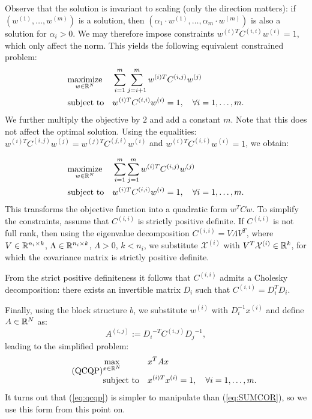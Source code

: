 Observe that the solution is invariant to scaling (only the direction matters): 
if $\left(w^{(1)}, \ldots, w^{(m)}\right)$ is a solution, then 
$\left(\alpha_1 \cdot w^{(1)}, \ldots, \alpha_m \cdot w^{(m)}\right)$ is also a 
solution for $\alpha_i > 0$. We may therefore impose constraints $w^{(i)T}C^{(i,i)}w^{(i)} = 1$, 
which only affect the norm. This yields the following  equivalent constrained problem:
\begin{equation}\label{eq:qcqp0}
\begin{aligned}
& \underset{w \in \mathbb{R}^N}{\text{maximize}}
& & \sum_{i = 1}^m \sum_{j = i+1}^m w^{(i)T} C^{(i,j)} w^{(j)}\\
& \text{subject to}
& &w^{(i)T} C^{(i,i)} w^{(i)} = 1, \quad\forall i = 1,\ldots, m.
\end{aligned}
\end{equation}
We further multiply the objective by $2$ and add a constant $m$. Note that this does not
affect the optimal solution. Using the equalities: $w^{(i)T} C^{(i,j)} w^{(j)} = w^{(j)T} C^{(j,i)} w^{(i)}$ 
and $w^{(i)T} C^{(i,i)} w^{(i)} = 1$, we obtain:

\begin{equation}\label{eq:qcqp05}
\begin{aligned}
& \underset{w \in \mathbb{R}^N}{\text{maximize}}
& & \sum_{i = 1}^m \sum_{j = 1}^m w^{(i)T} C^{(i,j)} w^{(j)}\\
& \text{subject to}
& &w^{(i)T} C^{(i,i)} w^{(i)} = 1, \quad\forall i = 1,\ldots, m.
\end{aligned}
\end{equation}
This transforms the objective function into a quadratic form $w^T C w$. To
simplify the constraints, assume that $C^{(i,i)}$ is strictly positive definite. 
If $C^{(i,i)}$ is not full rank, then using the eigenvalue decomposition 
$C^{(i,i)} = V \Lambda V^T$, where $V \in \mathbb{R}^{n_i \times k}$, 
$\Lambda \in \mathbb{R}^{n_i \times k}$, $\Lambda > 0$, $k < n_i$, 
we substitute $\mathcal{X}^{(i)}$ with $V^T \mathcal{X}^{(i)} \in \mathbb{R}^k$, 
for which the covariance matrix is strictly positive definite.

From the strict positive definiteness it follows that $C^{(i,i)}$ admits a Cholesky 
decomposition: there exists an invertible matrix $D_i$ such that $C^{(i,i)} = D_i^T D_i$.

Finally, using the block structure $b$, we substitute $w^{(i)}$ 
with $D_i^{-1} x^{(i)}$ and define $A \in \mathbb{R}^N$ as:
\begin{equation*}
A^{(i,j)} := {D_i}^{-T} C^{(i,j)} {D_j}^{-1},
\end{equation*}
leading to the simplified problem:
 \begin{equation}\label{eq:qcqp}
\tag{QCQP}
\begin{aligned}
& \underset{x \in \mathbb{R}^{N}}{\text{max}}
& & x^T A x\\
& \text{subject to}
& &x^{(i)T} x^{(i)} = 1, \quad\forall i = 1, \ldots, m.
\end{aligned}
\end{equation}
It turns out that (\ref{eq:qcqp}) is simpler to  manipulate than  (\ref{eq:SUMCOR}), so we use this form from this point on.

